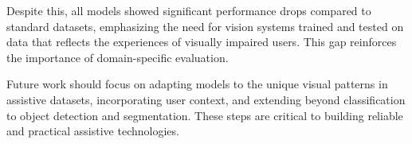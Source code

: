 \documentclass[9pt,a4paper,twocolumn,twoside]{tau-class/tau}
\begin{document}
Despite this, all models showed significant performance drops compared to standard datasets, emphasizing the need for vision systems trained and tested on data that reflects the experiences of visually impaired users. This gap reinforces the importance of domain-specific evaluation.

Future work should focus on adapting models to the unique visual patterns in assistive datasets, incorporating user context, and extending beyond classification to object detection and segmentation. These steps are critical to building reliable and practical assistive technologies.
\\
\\
\\
\\

\printbibliography

\end{document}
